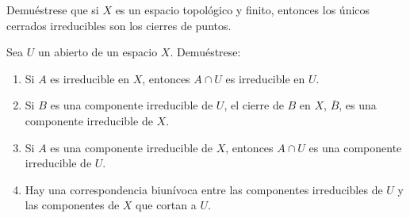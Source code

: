 \begin{ejer}[153]
Demuéstrese que si $X$ es un espacio topológico y finito, entonces los únicos cerrados irreducibles son los cierres de puntos.
\end{ejer}

\begin{ejer}[154]
Sea $U$ un abierto de un espacio $X$. Demuéstrese:
\begin{enumerate}
    \item[a)] Si $A$ es irreducible en $X$, entonces $A \cap U$ es irreducible en $U$.
    \item[b)] Si $B$ es una componente irreducible de $U$, el cierre de $B$ en $X$, $\overline{B}$, es una componente irreducible de $X$.
    \item[c)] Si $A$ es una componente irreducible de $X$, entonces $A \cap U$ es una componente irreducible de $U$.
    \item[d)] Hay una correspondencia biunívoca entre las componentes irreducibles de $U$ y las componentes de $X$ que cortan a $U$.
\end{enumerate}
\end{ejer}